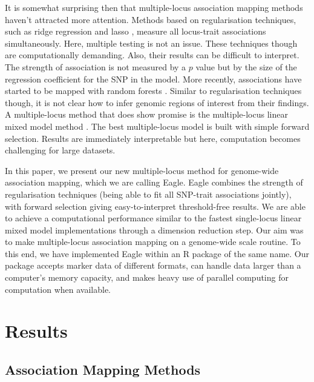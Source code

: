 \documentclass{article}
\begin{document}
It is somewhat surprising then that multiple-locus association mapping methods haven't attracted more attention. Methods based on 
regularisation techniques, such as ridge regression \cite{shen2013novel}  and lasso \cite{rakitsch2013lasso}, measure all locus-trait associations simultaneously. 
Here, multiple testing is not an issue. These techniques though are computationally demanding. Also, their results can be difficult to interpret. The strength of association is not measured by a $p$ value but by the size of the regression coefficient for the SNP in the model. More recently, associations have started to be mapped with random forests \cite{szymczak2016r2vim}. Similar to regularisation techniques though, it is not clear how to infer genomic regions of interest from their findings. A multiple-locus method that does show promise is the multiple-locus linear mixed model method \cite{segura2012efficient}. The best multiple-locus model is built with simple forward selection. Results are immediately interpretable but here, computation becomes challenging for large datasets. 

In this paper, we present our new multiple-locus method for genome-wide association mapping, which we are calling Eagle. 
Eagle combines the strength of regularisation techniques (being able to fit all SNP-trait associations jointly), with forward selection giving easy-to-interpret threshold-free results.   We are able to achieve a computational performance similar to the fastest single-locus linear mixed model implementations 
through a dimension reduction step.
Our aim was to make multiple-locus association mapping on a genome-wide scale routine. To this end, we have implemented Eagle 
within an R package of the same name. 
Our package accepts marker data of different 
formats,  can handle data larger than a computer's  memory capacity, and makes heavy use of 
parallel computing for computation when available.  


\section{Results}

\subsection{Association Mapping Methods}
\end{document}

